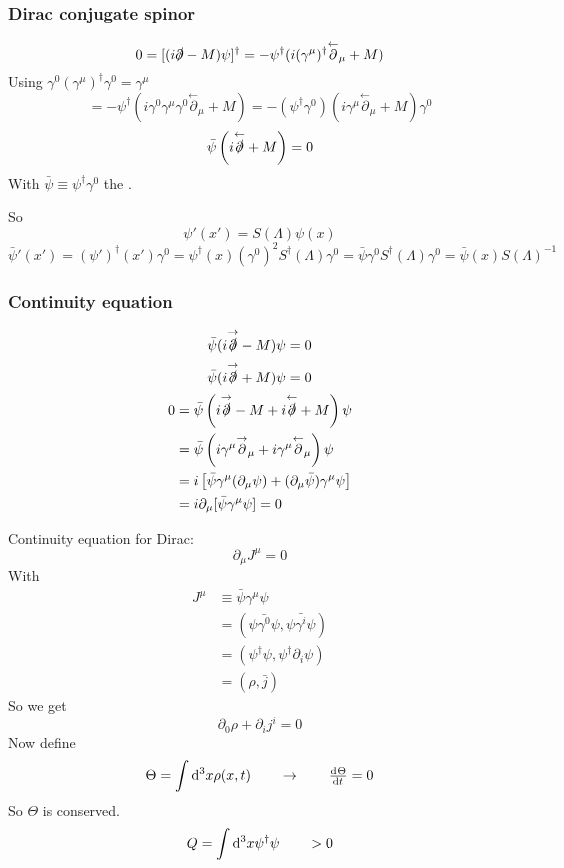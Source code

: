\subsubsection{Dirac conjugate spinor}

\[ 0 = [(i\slashed{\partial}-M)\psi]^\dagger = - \psi^\dagger(i(\gamma^\mu)^\dagger \overset{\leftarrow}{\partial}_\mu + M) \]
Using $\gamma^0(\gamma^\mu)^\dagger\gamma^0 = \gamma^\mu$
\[ = - \psi^\dagger(i\gamma^0\gamma^\mu\gamma^0 \overset{\leftarrow}{\partial}_\mu + M) = - (\psi^\dagger \gamma^0)\left(i\gamma^\mu\overset{\leftarrow}{\partial}_\mu + M\right)\gamma^0 \]
\[ \bar{\psi}\left(i\overset{\leftarrow}{\slashed{\partial}} + M\right) = 0 \]
With $\bar{\psi} \equiv \psi^\dagger\gamma^0$ the .

So
\[ \psi'(x') = S(\Lambda)\psi(x) \]
\[ \bar{\psi}'(x') = (\psi')^\dagger(x')\gamma^0 = \psi^\dagger(x)\left(\gamma^0\right)^2S^\dagger(\Lambda)\gamma^0 = \bar{\psi}\gamma^0S^\dagger(\Lambda)\gamma^0 = \bar{\psi}(x)S(\Lambda)^{-1} \]



\subsubsection{Continuity equation}
\[ \bar{\psi}(i\overset{\rightarrow}{\slashed{\partial}} - M)\psi = 0 \]
\[ \bar{\psi}(i\overset{\rightarrow}{\slashed{\partial}} + M)\psi = 0 \]
\begin{align*}
0 &= \bar{\psi}\left(i\overset{\rightarrow}{\slashed{\partial}} - M + i\overset{\leftarrow}{\slashed{\partial}} + M\right)\psi \\
&= \bar{\psi}\left(i\gamma^\mu\overset{\rightarrow}{\partial}_\mu + i \gamma^\mu\overset{\leftarrow}{\partial}_\mu\right)\psi \\
&= i \left[\bar{\psi}\gamma^\mu(\partial_\mu\psi) + (\partial_\mu\bar{\psi})\gamma^\mu\psi\right] \\
&= i \partial_\mu [ \bar{\psi}\gamma^\mu \psi] = 0
\end{align*}

Continuity equation for Dirac:
\[ \partial_\mu J^\mu = 0 \]
With 
\begin{align*} J^\mu &\equiv \bar{\psi}\gamma^\mu \psi \\
&= (\bar{\psi\gamma^0\psi}, \bar{\psi\gamma^i\psi}) \\
&= (\psi^\dagger\psi, \psi^\dagger\partial_i\psi) \\
&= (\rho, \bar{j})
\end{align*}
So we get
\[ \partial_0\rho + \partial_i j^i = 0 \]
Now define
\[ \Theta = \int \diff{^3x}\rho(x,t) \qquad \rightarrow \qquad \od{\Theta}{t} = 0 \]
So $\Theta$ is conserved.
\[ Q = \int \operatorname{d \!}{^3x}\psi^\dagger\psi \qquad > 0 \]

